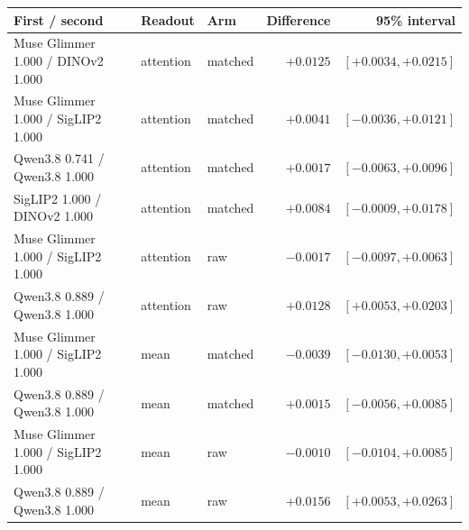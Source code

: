 \begin{tabular}{lllrr}
\toprule
First / second & Readout & Arm & Difference & 95\% interval\\
\midrule
Muse Glimmer 1.000 / DINOv2 1.000 & attention & matched & $+0.0125$ & $[+0.0034, +0.0215]$\\
Muse Glimmer 1.000 / SigLIP2 1.000 & attention & matched & $+0.0041$ & $[-0.0036, +0.0121]$\\
Qwen3.8 0.741 / Qwen3.8 1.000 & attention & matched & $+0.0017$ & $[-0.0063, +0.0096]$\\
SigLIP2 1.000 / DINOv2 1.000 & attention & matched & $+0.0084$ & $[-0.0009, +0.0178]$\\
Muse Glimmer 1.000 / SigLIP2 1.000 & attention & raw & $-0.0017$ & $[-0.0097, +0.0063]$\\
Qwen3.8 0.889 / Qwen3.8 1.000 & attention & raw & $+0.0128$ & $[+0.0053, +0.0203]$\\
Muse Glimmer 1.000 / SigLIP2 1.000 & mean & matched & $-0.0039$ & $[-0.0130, +0.0053]$\\
Qwen3.8 0.889 / Qwen3.8 1.000 & mean & matched & $+0.0015$ & $[-0.0056, +0.0085]$\\
Muse Glimmer 1.000 / SigLIP2 1.000 & mean & raw & $-0.0010$ & $[-0.0104, +0.0085]$\\
Qwen3.8 0.889 / Qwen3.8 1.000 & mean & raw & $+0.0156$ & $[+0.0053, +0.0263]$\\
\bottomrule
\end{tabular}
